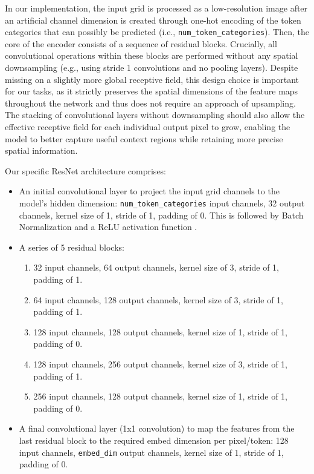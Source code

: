 In our implementation, the input grid is processed as a low-resolution image after an artificial channel dimension is created through one-hot encoding of the token categories that can possibly be predicted (i.e., \texttt{num\_token\_categories}). Then, the core of the encoder consists of a sequence of residual blocks. Crucially, all convolutional operations within these blocks are performed without any spatial downsampling (e.g., using stride 1 convolutions and no pooling layers). Despite missing on a slightly more global receptive field, this design choice is important for our tasks, as it strictly preserves the spatial dimensions of the feature maps throughout the network and thus does not require an approach of upsampling. The stacking of convolutional layers without downsampling should also allow the effective receptive field for each individual output pixel to grow, enabling the model to better capture useful context regions while retaining more precise spatial information.

Our specific ResNet architecture comprises:
    \begin{itemize}
        \item An initial convolutional layer to project the input grid channels to the model's hidden dimension: \texttt{num\_token\_categories} input channels, 32 output channels, kernel size of 1, stride of 1, padding of 0. This is followed by Batch Normalization \citep{ioffe2015batchnormalizationacceleratingdeep} and a ReLU activation function \citep{agarap2019deeplearningusingrectified}.
        
        \vspace{1em}
        \item A series of 5 residual blocks:
        \begin{enumerate}
            \item 32 input channels, 64 output channels, kernel size of 3, stride of 1, padding of 1.
            
            \item 64 input channels, 128 output channels, kernel size of 3, stride of 1, padding of 1.

            \item 128 input channels, 128 output channels, kernel size of 1, stride of 1, padding of 0.

            \item 128 input channels, 256 output channels, kernel size of 3, stride of 1, padding of 1.

            \item 256 input channels, 128 output channels, kernel size of 1, stride of 1, padding of 0.
            
        \end{enumerate}

        \vspace{1em}
        \item A final convolutional layer (1x1 convolution) to map the features from the last residual block to the required embed dimension per pixel/token: 128 input channels, \texttt{embed\_dim} output channels, kernel size of 1, stride of 1, padding of 0.

    \end{itemize}
    

